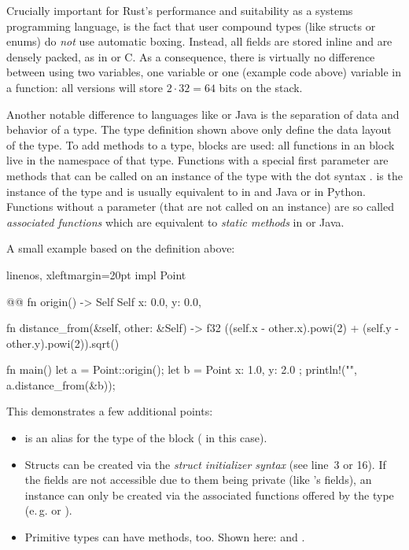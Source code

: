 Crucially important for Rust's performance and suitability as a systems programming language, is the fact that user compound types (like structs or enums) do \emph{not} use automatic boxing.
Instead, all fields are stored inline and are densely packed, as in \cpp or C.
As a consequence, there is virtually no difference between using two  variables, one \code{[f32; 2]} variable or one  (example code above) variable in a function: all versions will store $2 \cdot 32 = 64$ bits on the stack.

Another notable difference to languages like \cpp or Java is the separation of data and behavior of a type.
The type definition shown above only define the data layout of the type.
To add methods to a type,  blocks are used: all functions in an  block live in the namespace of that type.
Functions with a special first  parameter are methods that can be called on an instance of the type with the dot syntax .
 is the instance of the type and is usually equivalent to  in \cpp and Java or  in Python.
Functions without a  parameter (that are not called on an instance) are so called \emph{associated functions} which are equivalent to \emph{static methods} in \cpp or Java.

A small example based on the  definition above:

\begin{rustcode*}{linenos, xleftmargin=20pt}
impl Point { @@
    fn origin() -> Self {
        Self {
            x: 0.0,
            y: 0.0,
        }
    }

    fn distance_from(&self, other: &Self) -> f32 {
        ((self.x - other.x).powi(2) + (self.y - other.y).powi(2)).sqrt()
    }
}

fn main() {
    let a = Point::origin();
    let b = Point { x: 1.0, y: 2.0 };
    println!("{}", a.distance_from(&b));
}
\end{rustcode*}

This demonstrates a few additional points:

\vspace{-3mm}
\begin{itemize}
  \item {} is an alias for the type of the  block ( in this case).
  \item Structs can be created via the \emph{struct initializer syntax} (see line~3 or 16).
  If the fields are not accessible due to them being private (like 's fields), an instance can only be created via the associated functions offered by the type (e.\,g.  or ).
  \item Primitive types can have methods, too.
  Shown here:  and .
\end{itemize}

